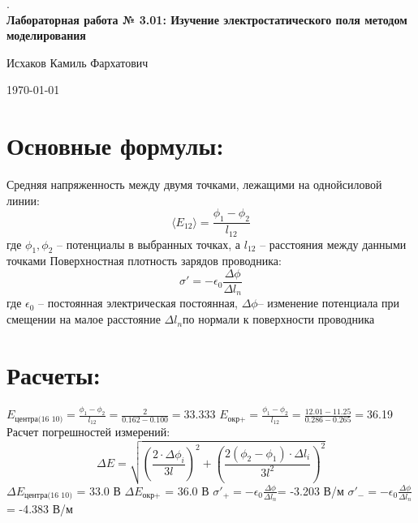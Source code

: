 \documentclass{article}%
\begin{document}
%
\normalsize%
\begin{center}%
.\\%
\vspace{12cm}%
\textbf{Лабораторная работа № 3.01: Изучение электростатического поля методом моделирования}%
\end{center}%
\begin{center}%
Исхаков Камиль Фархатович%
\end{center}%
\begin{center}%
\today%
\end{center}%
\newpage%
\section{Основные формулы:}%
\label{sec:}%

%
Средняя напряженность между двумя точками, лежащими на однойсиловой линии:\begin{displaymath}\langle E_{12} \rangle= \frac{\phi_1-\phi_2}{l_{12}}\end{displaymath}%
\newline%
где $\phi_1, \phi_2$ – потенциалы в выбранных точках, а $l_{12}$ – расстояния между данными точками%
\newline%
Поверхностная плотность зарядов проводника:\begin{displaymath}\sigma' = -\epsilon_0 \frac{\Delta \phi}{\Delta l_n}\end{displaymath}%
\newline%
где $\epsilon_0$ – постоянная электрическая постоянная, $\Delta \phi$– изменение потенциала при смещении на малое расстояние $\Delta l_n$по нормали к поверхности проводника%
\newline%
\section{Расчеты:}%
\label{sec:}%

%
$E_{\text{центра(16 10)}} = \frac{\phi_1-\phi_2}{l_{12}} = \frac{2}{0.162-0.100} = $33.333%
\newline%
$E_{\text{окр+}} = \frac{\phi_1-\phi_2}{l_{12}} = \frac{12.01-11.25}{0.286-0.265} = $36.19%
\newline%
Расчет погрешностей измерений:\begin{displaymath}\Delta E = \sqrt{\left(\frac{2\cdot \Delta \phi_i}{3 l}\right)^2+\left(\frac{2(\phi_2-\phi_1)\cdot \Delta l_i}{3 l^2}\right)^2}\end{displaymath}%
\newline%
$\Delta E_{\text{центра(16 10)}}$ = 33.0 В%
\newline%
$\Delta E_{\text{окр+}}$ = 36.0 В%
\newline%
$\sigma'_{+} = - \epsilon_0 \frac{\Delta \phi}{\Delta l_n} $= -3.203 В/м%
\newline%
$\sigma'_{-} = - \epsilon_0 \frac{\Delta \phi}{\Delta l_n} $= -4.383 В/м%
\newline%
\end{document}
